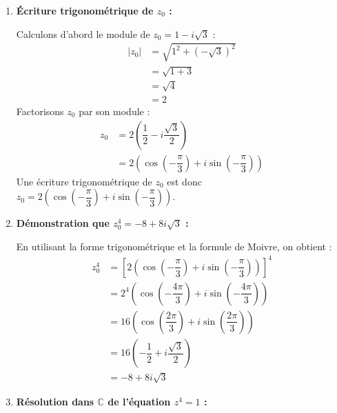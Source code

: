 \documentclass[12pt,a4paper]{article}
\begin{document}
\begin{enumerate}
    \item \textbf{Écriture trigonométrique de $z_0$ :}
    
    Calculons d'abord le module de $z_0 = 1 - i\sqrt{3}$ :
    $$
    \begin{aligned}
        |z_0| &= \sqrt{1^2 + (-\sqrt{3})^2} \\
        &= \sqrt{1 + 3} \\
        &= \sqrt{4} \\
        &= 2
    \end{aligned}
    $$
    Factorisons $z_0$ par son module :
    $$
    \begin{aligned}
        z_0 &= 2\left(\dfrac{1}{2} - i\dfrac{\sqrt{3}}{2}\right) \\
        &= 2\left(\cos\left(-\dfrac{\pi}{3}\right) + i\sin\left(-\dfrac{\pi}{3}\right)\right)
    \end{aligned}
    $$
    Une écriture trigonométrique de $z_0$ est donc $z_0 = 2\left(\cos\left(-\dfrac{\pi}{3}\right) + i\sin\left(-\dfrac{\pi}{3}\right)\right)$.

    \item \textbf{Démonstration que $z_0^4 = -8 + 8i\sqrt{3}$ :}
    
    En utilisant la forme trigonométrique et la formule de Moivre, on obtient :
    $$
    \begin{aligned}
        z_0^4 &= \left[2\left(\cos\left(-\dfrac{\pi}{3}\right) + i\sin\left(-\dfrac{\pi}{3}\right)\right)\right]^4 \\
        &= 2^4\left(\cos\left(-\dfrac{4\pi}{3}\right) + i\sin\left(-\dfrac{4\pi}{3}\right)\right) \\
        &= 16\left(\cos\left(\dfrac{2\pi}{3}\right) + i\sin\left(\dfrac{2\pi}{3}\right)\right) \\
        &= 16\left(-\dfrac{1}{2} + i\dfrac{\sqrt{3}}{2}\right) \\
        &= -8 + 8i\sqrt{3}
    \end{aligned}
    $$

    \item \textbf{Résolution dans $\mathbb{C}$ de l'équation $z^4 = 1$ :}
    

\end{enumerate}
\end{document}
